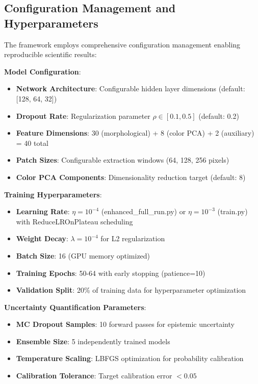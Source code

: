 \documentclass[twocolumn,10pt]{aastex631}
\begin{document}
\subsection{Configuration Management and Hyperparameters}

The framework employs comprehensive configuration management enabling reproducible scientific results:

\textbf{Model Configuration}:
\begin{itemize}
\item \textbf{Network Architecture}: Configurable hidden layer dimensions (default: [128, 64, 32])
\item \textbf{Dropout Rate}: Regularization parameter $\rho \in [0.1, 0.5]$ (default: 0.2)
\item \textbf{Feature Dimensions}: 30 (morphological) + 8 (color PCA) + 2 (auxiliary) = 40 total
\item \textbf{Patch Sizes}: Configurable extraction windows (64, 128, 256 pixels)
\item \textbf{Color PCA Components}: Dimensionality reduction target (default: 8)
\end{itemize}

\textbf{Training Hyperparameters}:
\begin{itemize}
\item \textbf{Learning Rate}: $\eta = 10^{-4}$ (enhanced\_full\_run.py) or $\eta = 10^{-3}$ (train.py) with ReduceLROnPlateau scheduling
\item \textbf{Weight Decay}: $\lambda = 10^{-4}$ for L2 regularization
\item \textbf{Batch Size}: 16 (GPU memory optimized)
\item \textbf{Training Epochs}: 50-64 with early stopping (patience=10)
\item \textbf{Validation Split}: 20\% of training data for hyperparameter optimization
\end{itemize}

\textbf{Uncertainty Quantification Parameters}:
\begin{itemize}
\item \textbf{MC Dropout Samples}: 10 forward passes for epistemic uncertainty
\item \textbf{Ensemble Size}: 5 independently trained models
\item \textbf{Temperature Scaling}: LBFGS optimization for probability calibration
\item \textbf{Calibration Tolerance}: Target calibration error $< 0.05$
\end{itemize}
\end{document}

